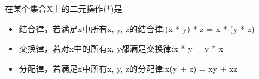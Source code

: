 在某个集合X上的二元操作(*)是

\begin{itemize}
\item 
结合律，若满足x中所有x, y, z的结合律:(x * y) * z = x * (y * z)

\item 
交换律，若对x中的所有x, y都满足交换律:x * y = y * x

\item 
分配律，若满足x中所有x, y, z的分配律:x(y + z) = xy + xz
\end{itemize}